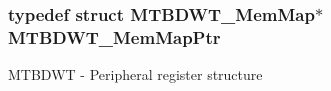 \subsubsection[{\texorpdfstring{M\+T\+B\+D\+W\+T\+\_\+\+Mem\+Map\+Ptr}{MTBDWT_MemMapPtr}}]{\setlength{\rightskip}{0pt plus 5cm}typedef struct {\bf M\+T\+B\+D\+W\+T\+\_\+\+Mem\+Map}$\ast$ {\bf M\+T\+B\+D\+W\+T\+\_\+\+Mem\+Map\+Ptr}}\hypertarget{group___m_t_b_d_w_t___peripheral_ga8dd9bf791ed255926ccd995a6236caaf}{}\label{group___m_t_b_d_w_t___peripheral_ga8dd9bf791ed255926ccd995a6236caaf}
M\+T\+B\+D\+WT -\/ Peripheral register structure 